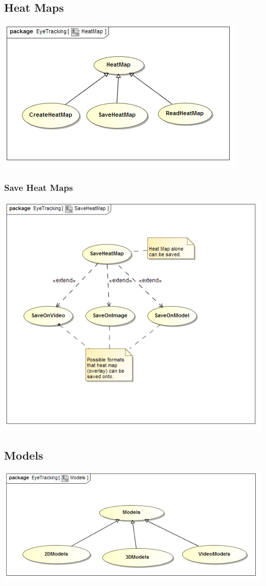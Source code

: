 \subsection{Heat Maps}
	\includegraphics[scale=0.5]{Diagrams/Use_Case_Diagram__HeatMap.png}
	
	
	\subsubsection{Save Heat Maps}
		\includegraphics[scale=0.5]{Diagrams/Use_Case_Diagram__SaveHeatMap.png}
		
		
\subsection{Models}
	\includegraphics[scale=0.5]{Diagrams/Use_Case_Diagram__Models.png}
	
